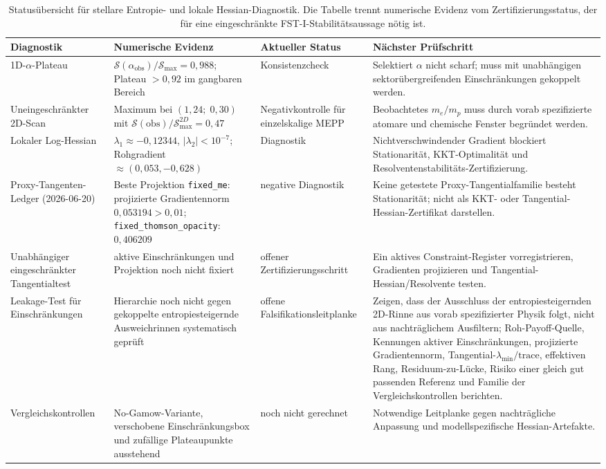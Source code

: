 \documentclass[12pt,a4paper]{article}
\theoremstyle{remark}
\begin{document}
\begin{table}[htbp]
\centering
\caption{Status\"ubersicht f\"ur stellare Entropie- und lokale Hessian-Diagnostik. Die Tabelle trennt numerische Evidenz vom Zertifizierungsstatus, der f\"ur eine eingeschr\"ankte FST-I-Stabilit\"atsaussage n\"otig ist.}
\label{tab:kkt-ledger}
\begingroup\footnotesize
\begin{tabularx}{\textwidth}{p{}p{}p{}Y}
\toprule
\textbf{Diagnostik} & \textbf{Numerische Evidenz} & \textbf{Aktueller Status} & \textbf{N\"achster Pr\"ufschritt} \\
\midrule
1D-$\alpha$-Plateau & $\mathcal{S}(\alpha_{\mathrm{obs}})/\mathcal{S}_{\max}=0{,}988$; Plateau $>0{,}92$ im gangbaren Bereich & Konsistenzcheck & Selektiert $\alpha$ nicht scharf; muss mit unabh\"angigen sektor\"ubergreifenden Einschr\"ankungen gekoppelt werden. \\
Uneingeschr\"ankter 2D-Scan & Maximum bei $(1{,}24;\;0{,}30)$ mit $\mathcal{S}(\mathrm{obs})/\mathcal{S}_{\max}^{2D}=0{,}47$ & Negativkontrolle f\"ur einzelskalige MEPP & Beobachtetes $m_e/m_p$ muss durch vorab spezifizierte atomare und chemische Fenster begr\"undet werden. \\
Lokaler Log-Hessian & $\lambda_1\approx -0{,}12344$, $|\lambda_2|<10^{-7}$; Rohgradient $\approx(0{,}053,-0{,}628)$ & Diagnostik & Nichtverschwindender Gradient blockiert Stationarit\"at, KKT-Optimalit\"at und Resolventenstabilit\"ats-Zertifizierung. \\
Proxy-Tangenten-Ledger (2026-06-20) & Beste Projektion \texttt{fixed\_me}: projizierte Gradientennorm $0{,}053194>0{,}01$; \texttt{fixed\_thomson\_opacity}: $0{,}406209$ & negative Diagnostik & Keine getestete Proxy-Tangentialfamilie besteht Stationarit\"at; nicht als KKT- oder Tangential-Hessian-Zertifikat darstellen. \\
Unabh\"angiger eingeschr\"ankter Tangentialtest & aktive Einschr\"ankungen und Projektion noch nicht fixiert & offener Zertifizierungsschritt & Ein aktives Constraint-Register vorregistrieren, Gradienten projizieren und Tangential-Hessian/Resolvente testen. \\
Leakage-Test f\"ur Einschr\"ankungen & Hierarchie noch nicht gegen gekoppelte entropiesteigernde Ausweichrinnen systematisch gepr\"uft & offene Falsifikationsleitplanke & Zeigen, dass der Ausschluss der entropiesteigernden 2D-Rinne aus vorab spezifizierter Physik folgt, nicht aus nachträglichem Ausfiltern; Roh-Payoff-Quelle, Kennungen aktiver Einschr\"ankungen, projizierte Gradientennorm, Tangential-$\lambda_{\min}/\mathrm{trace}$, effektiven Rang, Residuum-zu-Lücke, Risiko einer gleich gut passenden Referenz und Familie der Vergleichskontrollen berichten. \\
Vergleichs\-kontrollen & No-Gamow-Variante, verschobene Einschr\"ankungsbox und zuf\"allige Plateaupunkte ausstehend & noch nicht gerechnet & Notwendige Leitplanke gegen nachtr\"agliche Anpassung und modellspezifische Hessian-Artefakte. \\
\bottomrule
\end{tabularx}
\endgroup
\end{table}
\end{document}
